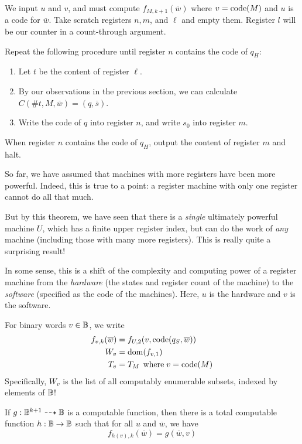 \documentclass{article}
\begin{document}
\begin{prf}
	We input $u$ and $v$, and must compute $f_{M,k+1}(\overline w)$ where $v = \operatorname{code} (M)$ and $u$ is a code for $\overline w$. Take scratch registers $n, m$, and $\ell$ and empty them. Register $l$ will be our counter in a count-through argument.
	    
	Repeat the following procedure until register $n$ contains the code of $q_H$:
	\begin{enumerate}
		\item Let $t$ be the content of register $\ell$.
		\item By our observations in the previous section, we can calculate $C(\# t, M, \overline w) = (q, \overline s)$.
		\item Write the code of $q$ into register $n$, and write $s_0$ into register $m$.
	\end{enumerate}
	When register $n$ contains the code of $q_H$, output the content of register $m$ and halt.
\end{prf}

So far, we have assumed that machines with more registers have been more powerful. Indeed, this is true to a point: a register machine with only one register cannot do all that much.

But by this theorem, we have seen that there is a \textit{single} ultimately powerful machine $U$, which has a finite upper register index, but can do the work of \textit{any} machine (including those with many more registers). This is really quite a surprising result!

In some sense, this is a shift of the complexity and computing power of a register machine from the \textit{hardware} (the states and register count of the machine) to the \textit{software} (specified as the code of the machines). Here, $u$ is the hardware and $v$ is the software.

For binary words $v \in \mathbb{B}$, we write
\begin{align*}
	f_{v,k} (\overline w) & = f_{U,2}(v, \operatorname{code}(q_S, \overline w)) \\
	W_v                   & = \operatorname{dom} (f_{v,1})                      \\
	T_v                   & = T_M \mathrel{\, \text{where}} v = \operatorname{code}(M)             
\end{align*}
Specifically, $W_v$ is the list of all computably enumerable subsets, indexed by elements of $\mathbb{B}$!

\begin{theorem}
	\label{smn}
	If $g: \mathbb{B}^{k+1} \dashrightarrow \mathbb{B}$ is a computable function, then there is a total computable function $h: \mathbb{B} \to \mathbb{B}$ such that for all $u$ and $\overline w$, we have
	\[
		f_{h(v),k}(\overline w) = g(\overline w, v)
	\]
\end{theorem}
\end{document}
